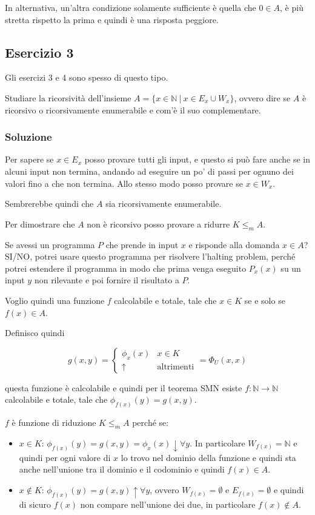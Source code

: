 In alternativa, un'altra condizione solamente sufficiente è quella che $0 \in A$, è più stretta rispetto la prima e quindi è una risposta peggiore.

\subsection{Esercizio 3}

Gli esercizi 3 e 4 sono spesso di questo tipo.

Studiare la ricorsività dell'insieme $A = \{ x \in \mathbb{N} \: | \: x \in E_x \cup W_x \}$, ovvero dire se $A$ è ricorsivo o ricorsivamente enumerabile e com'è il suo complementare.

\subsubsection{Soluzione}

Per sapere se $x \in E_x$ posso provare tutti gli input, e questo si può fare anche se in alcuni input non termina, andando ad eseguire un po' di passi per ognuno dei valori fino a che non termina.
Allo stesso modo posso provare se $x \in W_x$.

Sembrerebbe quindi che $A$ sia ricorsivamente enumerabile.

Per dimostrare che $A$ non è ricorsivo posso provare a ridurre $K \leq_m A$.

Se avessi un programma $P$ che prende in input $x$ e risponde alla domanda $x \in A$? SI/NO, potrei usare questo programma per risolvere l'halting problem, perché potrei estendere il programma in modo che prima venga eseguito $P_x(x)$ su un input $y$ non rilevante e poi fornire il risultato a $P$.

Voglio quindi una funzione $f$ calcolabile e totale, tale che $x \in K$ se e solo se $f(x) \in A$.

Definisco quindi 

$$
g(x, y) = \begin{cases}
\phi_x(x) & x \in K \\
\uparrow &\text{altrimenti}
\end{cases} = \Phi_U(x,x)
$$

questa funzione è calcolabile e quindi per il teorema SMN esiste $f : \mathbb{N} \rightarrow \mathbb{N}$ calcolabile e totale, tale che $\phi_{f(x)}(y) = g(x,y)$.

$f$ è funzione di riduzione $K \leq_m A$ perché se:

\begin{itemize}
	\item $x \in K$: $\phi_{f(x)}(y) = g(x,y) = \phi_x(x) \downarrow \forall y$. In particolare $W_{f(x)} = \mathbb{N}$ e quindi per ogni valore di $x$ lo trovo nel dominio della funzione e quindi sta anche nell'unione tra il dominio e il codominio e quindi $f(x) \in A$.
	\item $x \notin K$: $\phi_{f(x)}(y) = g(x,y) \uparrow \forall y$, ovvero $W_{f(x)} = \emptyset$ e $E_{f(x)} = \emptyset$ e quindi di sicuro $f(x)$ non compare nell'unione dei due, in particolare $f(x) \notin A$.
\end{itemize}

